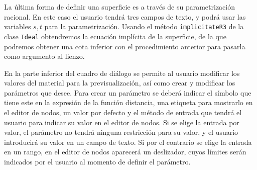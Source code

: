 La última forma de definir una superficie es a través de su parametrización racional. En este caso el usuario tendrá tres campos de texto, y podrá usar las variables $s,t$ para la parametrización. Usando el método \texttt{implicitateR3} de la clase \texttt{Ideal} obtendremos la ecuación implícita de la superficie, de la que podremos obtener una cota inferior con el procedimiento anterior para pasarla como argumento al lienzo.

En la parte inferior del cuadro de diálogo se permite al usuario modificar los valores del material para la previsualización, así como crear y modificar los parámetros que desee. Para crear un parámetro se deberá indicar el símbolo que tiene este en la expresión de la función distancia, una etiqueta para mostrarlo en el editor de nodos, un valor por defecto y el método de entrada que tendrá el usuario para indicar  su valor en el editor de nodos. Si se elige la entrada por valor, el parámetro no tendrá ninguna restricción para su valor, y el usuario introducirá su valor en un campo de texto. Si por el contrario se elige la entrada en un rango, en el editor de nodos aparecerá un deslizador, cuyos límites serán indicados por el usuario al momento de definir el parámetro.

